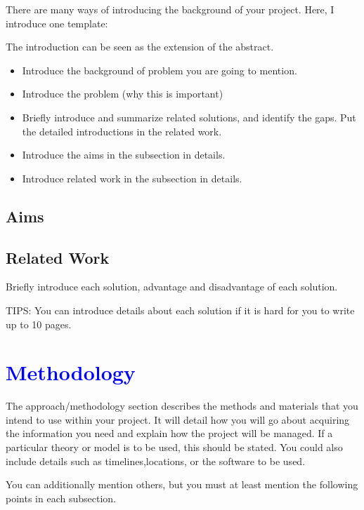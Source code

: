 \documentclass[12pt]{article}
\newcommand{\tb}{\textcolor{blue}}
\begin{document}
{\medskip


There are many ways of introducing the background of your project. Here, I introduce one template:

The introduction can be seen as the extension of the abstract.
\begin{itemize}
\item Introduce the background of problem you are going to mention.

\item Introduce the problem (why this is important)


\item Briefly introduce and summarize related solutions, and identify the gaps. Put the detailed introductions in the related work.


\item Introduce the aims in the subsection in details.

\item  Introduce related work  in the subsection in details.
\end{itemize}


\subsection{Aims}

\subsection{Related Work}


Briefly introduce each solution, advantage and disadvantage of each solution.

TIPS: You can introduce details about each solution if it is hard for you to write up to 10 pages.


\section{\tb{Methodology}}
The approach/methodology section describes the methods and materials that you intend to use within your project. It will detail how you will go about acquiring the information you need and explain how the project will be managed. If a particular theory or model is to be used, this should be stated. You could also include details such as timelines,locations, or the software to be used.





You can additionally mention others, but you must at least mention the following points in each subsection.

}
\end{document}
